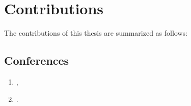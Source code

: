 

\section{Contributions}
The contributions of this thesis are summarized as follows:
\subsection*{Conferences}
\nobibliography*
\begin{enumerate}
      \item {},
      \item {}.
\end{enumerate}

